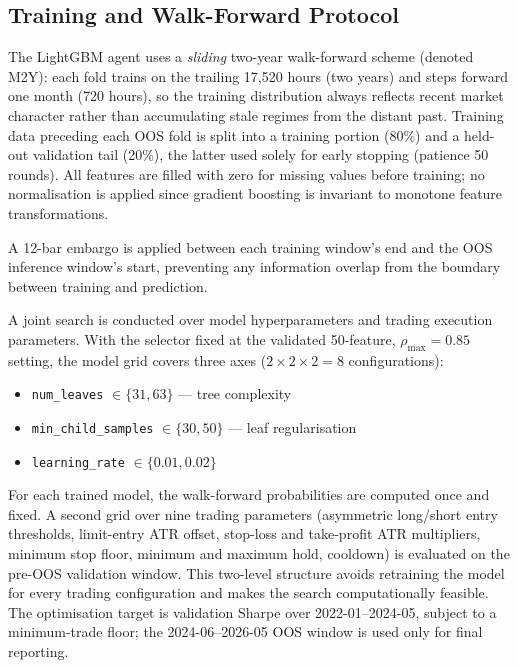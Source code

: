 \subsection{Training and Walk-Forward Protocol}
\label{sec:lgbm_grid}

The LightGBM agent uses a \textit{sliding} two-year walk-forward scheme (denoted M2Y): each fold trains on the trailing 17,520 hours (two years) and steps forward one month (720 hours), so the training distribution always reflects recent market character rather than accumulating stale regimes from the distant past. Training data preceding each OOS fold is split into a training portion (80\%) and a held-out validation tail (20\%), the latter used solely for early stopping (patience 50 rounds). All features are filled with zero for missing values before training; no normalisation is applied since gradient boosting is invariant to monotone feature transformations.


A 12-bar embargo is applied between each training window's end and the OOS inference window's start, preventing any information overlap from the boundary between training and prediction.


A joint search is conducted over model hyperparameters and trading execution parameters. With the selector fixed at the validated 50-feature, $\rho_{\max}=0.85$ setting, the model grid covers three axes ($2 \times 2 \times 2 = 8$ configurations):

\begin{itemize}
    \item \texttt{num\_leaves} $\in \{31, 63\}$ — tree complexity
    \item \texttt{min\_child\_samples} $\in \{30, 50\}$ — leaf regularisation
    \item \texttt{learning\_rate} $\in \{0.01, 0.02\}$
\end{itemize}

For each trained model, the walk-forward probabilities are computed once and fixed. A second grid over nine trading parameters (asymmetric long/short entry thresholds, limit-entry ATR offset, stop-loss and take-profit ATR multipliers, minimum stop floor, minimum and maximum hold, cooldown) is evaluated on the pre-OOS validation window. This two-level structure avoids retraining the model for every trading configuration and makes the search computationally feasible. The optimisation target is validation Sharpe over 2022-01--2024-05, subject to a minimum-trade floor; the 2024-06--2026-05 OOS window is used only for final reporting.


